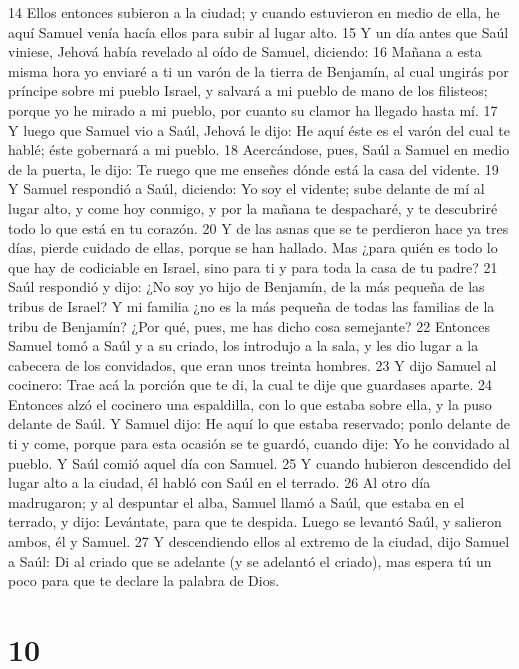 14 Ellos entonces subieron a la ciudad; y cuando estuvieron en medio de ella, he aquí Samuel venía hacía ellos para subir al lugar alto.
15 Y un día antes que Saúl viniese, Jehová había revelado al oído de Samuel, diciendo:
16 Mañana a esta misma hora yo enviaré a ti un varón de la tierra de Benjamín, al cual ungirás por príncipe sobre mi pueblo Israel, y salvará a mi pueblo de mano de los filisteos; porque yo he mirado a mi pueblo, por cuanto su clamor ha llegado hasta mí.
17 Y luego que Samuel vio a Saúl, Jehová le dijo: He aquí éste es el varón del cual te hablé; éste gobernará a mi pueblo.
18 Acercándose, pues, Saúl a Samuel en medio de la puerta, le dijo: Te ruego que me enseñes dónde está la casa del vidente.
19 Y Samuel respondió a Saúl, diciendo: Yo soy el vidente; sube delante de mí al lugar alto, y come hoy conmigo, y por la mañana te despacharé, y te descubriré todo lo que está en tu corazón.
20 Y de las asnas que se te perdieron hace ya tres días, pierde cuidado de ellas, porque se han hallado. Mas ¿para quién es todo lo que hay de codiciable en Israel, sino para ti y para toda la casa de tu padre?
21 Saúl respondió y dijo: ¿No soy yo hijo de Benjamín, de la más pequeña de las tribus de Israel? Y mi familia ¿no es la más pequeña de todas las familias de la tribu de Benjamín? ¿Por qué, pues, me has dicho cosa semejante?
22 Entonces Samuel tomó a Saúl y a su criado, los introdujo a la sala, y les dio lugar a la cabecera de los convidados, que eran unos treinta hombres.
23 Y dijo Samuel al cocinero: Trae acá la porción que te di, la cual te dije que guardases aparte.
24 Entonces alzó el cocinero una espaldilla, con lo que estaba sobre ella, y la puso delante de Saúl. Y Samuel dijo: He aquí lo que estaba reservado; ponlo delante de ti y come, porque para esta ocasión se te guardó, cuando dije: Yo he convidado al pueblo. Y Saúl comió aquel día con Samuel.
25 Y cuando hubieron descendido del lugar alto a la ciudad, él habló con Saúl en el terrado.
26 Al otro día madrugaron; y al despuntar el alba, Samuel llamó a Saúl, que estaba en el terrado, y dijo: Levántate, para que te despida. Luego se levantó Saúl, y salieron ambos, él y Samuel.
27 Y descendiendo ellos al extremo de la ciudad, dijo Samuel a Saúl: Di al criado que se adelante (y se adelantó el criado), mas espera tú un poco para que te declare la palabra de Dios.

\chapter{10}


